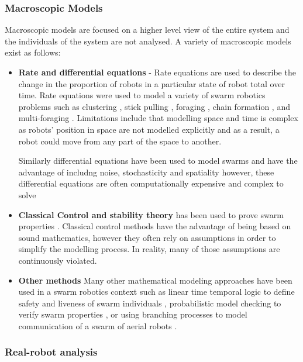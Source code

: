 \subsubsection{Macroscopic Models}
\label{macroscopicmodels}

Macroscopic models are focused on a higher level view of the entire system and the individuals of the system are not analysed. A variety of macroscopic models exist as follows: 
\begin{itemize}
	\item \textbf{Rate and differential equations} - Rate equations are used to describe the change in the proportion of robots in a particular state of robot total over time. Rate equations were used to model a variety of swarm robotics problems such as  clustering \cite{martinoli1999understanding}, stick pulling \cite{lerman2001macroscopic}, foraging \cite{lerman2002mathematical}, chain formation \cite{trianni2002modeling}, and multi-foraging \cite{campo2007efficient}. Limitations include that modelling space and time is complex as robots' position in space are not modelled explicitly and as a result, a robot could move from any part of the space to another.

Similarly differential equations have been used to model swarms and have the advantage of includng noise, stochasticity and spatiality however, these differential equations are often computationally expensive and complex to solve \cite{hamann2008framework, prorok2011multi}

	\item \textbf{Classical Control and stability theory} has been used to prove swarm properties \cite{gazi2005stability,liu2004stable, schwager2011time}. Classical control methods have the advantage of being based on sound mathematics, however they often rely on assumptions in order to simplify the modelling process. In reality, many of those assumptions are continuously violated.
	
	\item \textbf{Other methods}
	Many other mathematical modeling approaches have been used in a swarm robotics context such as linear time temporal logic to define safety and liveness of swarm individuals \cite{winfield2005formal}, probabilistic model checking to verify swarm properties \cite{konur2012analysing}, or using branching processes to model communication of a swarm of aerial robots \cite{mathews2010establishing}. 
\end{itemize}

\subsubsection{Real-robot analysis}

